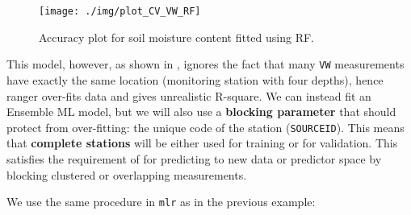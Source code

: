 \documentclass[
  graybox,natbib,nospthms]{svmono}
\newenvironment{Shaded}{\begin{snugshade}}{\end{snugshade}}
\newcommand{\AttributeTok}[1]{\textcolor[rgb]{0.61,0.61,0.61}{#1}}
\newcommand{\CommentTok}[1]{\textcolor[rgb]{0.37,0.37,0.37}{\textit{#1}}}
\newcommand{\DecValTok}[1]{\textcolor[rgb]{0.06,0.06,0.06}{#1}}
\newcommand{\DocumentationTok}[1]{\textcolor[rgb]{0.37,0.37,0.37}{\textbf{\textit{#1}}}}
\newcommand{\FunctionTok}[1]{\textcolor[rgb]{0,0,0}{#1}}
\newcommand{\NormalTok}[1]{#1}
\newcommand{\OtherTok}[1]{\textcolor[rgb]{0.37,0.37,0.37}{#1}}
\newcommand{\SpecialCharTok}[1]{\textcolor[rgb]{0,0,0}{#1}}
\newcommand{\StringTok}[1]{\textcolor[rgb]{0.5,0.5,0.5}{#1}}
\begin{document}
\begin{figure}

{\centering \texttt{[image: ./img/plot\_CV\_VW\_RF]} 

}

\caption{Accuracy plot for soil moisture content fitted using RF.}\label{fig:ac-vw1}
\end{figure}

This model, however, as shown in \citet{gasch2015spatio}, ignores the fact that many
\texttt{VW} measurements have exactly the same location (monitoring station with four
depths), hence ranger over-fits data and gives unrealistic R-square.
We can instead fit an Ensemble ML model, but we will also use a \textbf{blocking
parameter} that should protect from over-fitting: the unique code of
the station (\texttt{SOURCEID}). This means that \textbf{complete stations} will be
either used for training or for validation. This satisfies the
requirement of \citet{roberts2017cross} for predicting to new data or predictor
space by blocking clustered or overlapping measurements.

We use the same procedure in \texttt{mlr} as in the previous example:

\begin{Shaded}
\end{Shaded}
\end{document}
